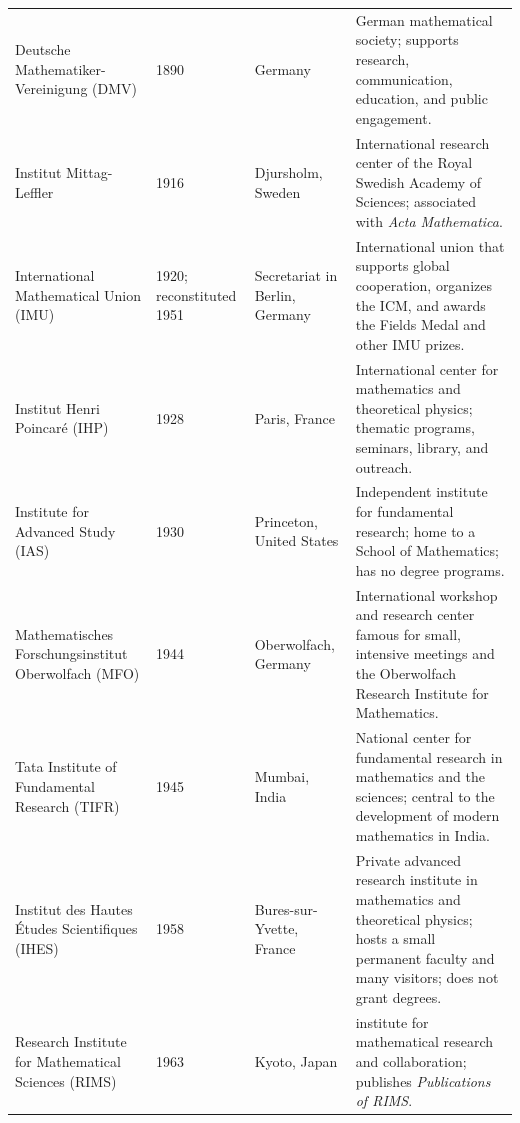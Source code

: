 {\begin{longtable}{@{}L{0.24\textwidth}L{0.10\textwidth}L{0.20\textwidth}L{0.38\textwidth}@{}}
        Deutsche Mathematiker-Vereinigung (DMV)
        & 1890
        & Germany
        & German mathematical society; supports research, communication,
          education, and public engagement. \\

        Institut Mittag-Leffler
        & 1916
        & Djursholm, Sweden
        & International research center of the Royal Swedish Academy of
          Sciences; associated with \textit{Acta Mathematica}. \\

        International Mathematical Union (IMU)
        & 1920; reconstituted 1951
        & Secretariat in Berlin, Germany
        & International union that supports global cooperation, organizes the
          ICM, and awards the Fields Medal and other IMU prizes. \\

        Institut Henri Poincaré (IHP)
        & 1928
        & Paris, France
        & International center for mathematics and theoretical physics;
          thematic programs, seminars, library, and outreach. \\

        Institute for Advanced Study (IAS)
        & 1930
        & Princeton, United States
        & Independent institute for fundamental research; home to a School of
          Mathematics; has no degree programs. \\

        Mathematisches Forschungsinstitut Oberwolfach (MFO)
        & 1944
        & Oberwolfach, Germany
        & International workshop and research center famous for small,
          intensive meetings and the Oberwolfach Research Institute for
          Mathematics. \\

        Tata Institute of Fundamental Research (TIFR)
        & 1945
        & Mumbai, India
        & National center for fundamental research in mathematics and the
          sciences; central to the development of modern mathematics in India. \\

        Institut des Hautes Études Scientifiques (IHES)
        & 1958
        & Bures-sur-Yvette, France
        & Private advanced research institute in mathematics and theoretical
          physics; hosts a small permanent faculty and many visitors; does not
          grant degrees. \\

        Research Institute for Mathematical Sciences (RIMS)
        & 1963
        & Kyoto, Japan
        & \KyotoUniversity{} institute for mathematical research and
          collaboration; publishes \textit{Publications of RIMS}. \\


\end{longtable}}
